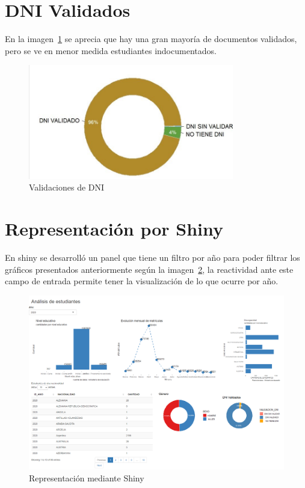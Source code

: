 \section{DNI Validados}

En la imagen~\ref{fig:validaciondni} se aprecia que hay una gran mayoría de documentos validados, pero se ve en menor medida estudiantes indocumentados.

\begin{figure}[!h]
\centering
\includegraphics[width=0.8\textwidth]{Figures/validacionDNI}
\decoRule
\caption[DNI Validados]{Validaciones de DNI}
\label{fig:validaciondni}
\end{figure}

\section{Representación por Shiny}
En shiny se desarrolló un panel que tiene un filtro por año para poder filtrar los gráficos presentados anteriormente según la imagen~\ref{fig:shiny}, la reactividad ante este campo de entrada permite tener la visualización de lo que ocurre por año.
\begin{figure}[th]
\centering
\includegraphics[width=1\textwidth]{Figures/shiny}
\decoRule
\caption[Shiny]{Representación mediante Shiny}
\label{fig:shiny}
\end{figure}

